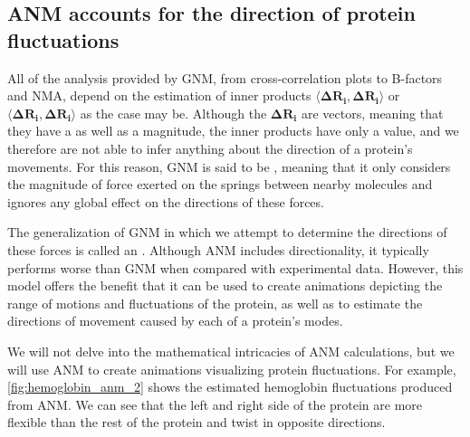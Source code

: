 \FloatBarrier
{}
\subsection{ANM accounts for the direction of protein fluctuations}

All of the analysis provided by GNM, from cross-correlation plots to B-factors and NMA, depend on the estimation of inner products $ \langle \mathbf{\Delta R_i}, \mathbf{\Delta R_i} \rangle $ or $ \langle \mathbf{\Delta R_i}, \mathbf{\Delta R_i} \rangle $ as the case may be. Although the $ \mathbf{\Delta R_i} $ are vectors, meaning that they have a  as well as a magnitude, the inner products have only a value, and we therefore are not able to infer anything about the direction of a protein's movements. For this reason, GNM is said to be , meaning that it only considers the magnitude of force exerted on the springs between nearby molecules and ignores any global effect on the directions of these forces.

The generalization of GNM in which we attempt to determine the directions of these forces is called an . Although ANM includes directionality, it typically performs worse than GNM when compared with experimental data. However, this model offers the benefit that it can be used to create animations depicting the range of motions and fluctuations of the protein, as well as to estimate the directions of movement caused by each of a protein's modes.

We will not delve into the mathematical intricacies of ANM calculations, but we will use ANM to create animations visualizing protein fluctuations. For example, \autoref{fig:hemoglobin_anm_2} shows the estimated hemoglobin fluctuations produced from ANM. We can see that the left and right side of the protein are more flexible than the rest of the protein and twist in opposite directions.\\

